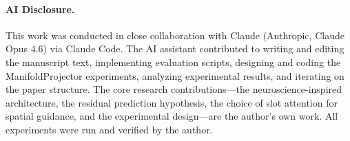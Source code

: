 \documentclass{article}
\begin{document}
\paragraph{AI Disclosure.}
This work was conducted in close collaboration with Claude (Anthropic,
Claude Opus 4.6) via Claude Code.
The AI assistant contributed to writing and editing the manuscript text,
implementing evaluation scripts, designing and coding the
ManifoldProjector experiments, analyzing experimental results, and
iterating on the paper structure.
The core research contributions---the neuroscience-inspired architecture,
the residual prediction hypothesis, the choice of slot attention for
spatial guidance, and the experimental design---are the author's own work.
All experiments were run and verified by the author.
\end{document}
